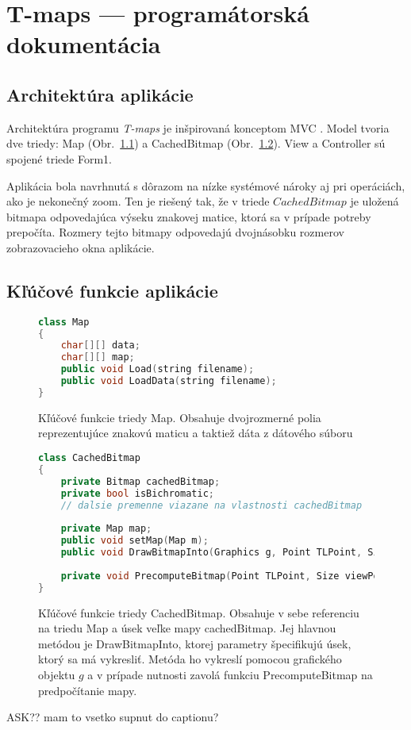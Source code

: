 \chapter{T-maps --- programátorská dokumentácia}
\label{programdoc}

\section{Architektúra aplikácie}
Architektúra programu \emph{T-maps} je inšpirovaná konceptom MVC \cite{krasner_mvc_1988}.
Model tvoria dve triedy: Map (Obr.~\ref{fig:map_interface}) a CachedBitmap (Obr.~\ref{fig:cachedbitmap_interface_plus}).
View a Controller sú spojené triede Form1.


Aplikácia bola navrhnutá s dôrazom na nízke systémové nároky aj pri operáciách, ako je nekonečný zoom. 
Ten je riešený tak, že v triede $CachedBitmap$  je uložená bitmapa odpovedajúca výseku znakovej matice, ktorá sa v prípade potreby prepočíta.
Rozmery tejto bitmapy odpovedajú dvojnásobku rozmerov zobrazovacieho okna aplikácie.

\section{Kľúčové funkcie aplikácie}



\begin{figure}[H]
\begin{lstlisting}[language=C++]
class Map
{
    char[][] data;
    char[][] map;
    public void Load(string filename);
    public void LoadData(string filename);
}
\end{lstlisting}
\caption{Kľúčové funkcie triedy Map. Obsahuje dvojrozmerné polia reprezentujúce znakovú maticu a taktiež dáta z dátového súboru}
\label{fig:map_interface}
\end{figure}



\begin{figure}[H]
\begin{lstlisting}[language=C++]
class CachedBitmap
{
	private Bitmap cachedBitmap;
	private bool isBichromatic;
	// dalsie premenne viazane na vlastnosti cachedBitmap
	
    private Map map;
    public void setMap(Map m);
    public void DrawBitmapInto(Graphics g, Point TLPoint, Size ViewPortSize, int squareS, bool isBichrom, bool forcePrecomputing = false);
 
    private void PrecomputeBitmap(Point TLPoint, Size viewPortSize);
}
\end{lstlisting}
\caption{Kľúčové funkcie triedy CachedBitmap. 
Obsahuje v sebe referenciu na triedu Map a úsek veľke mapy cachedBitmap. Jej hlavnou metódou je DrawBitmapInto,
ktorej parametry špecifikujú úsek, ktorý sa má vykresliť. Metóda ho vykreslí pomocou grafického objektu $g$ a v prípade nutnosti zavolá funkciu
PrecomputeBitmap na predpočítanie mapy.}
\label{fig:cachedbitmap_interface_plus}
\end{figure}

ASK?? mam to vsetko supnut do captionu?
